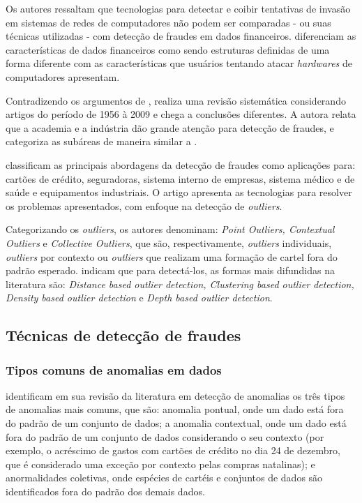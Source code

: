 \documentclass[smallextended]{svjour3}
\begin{document}
Os autores ressaltam que tecnologias para detectar e coibir tentativas de invasão em sistemas de redes de computadores não podem ser comparadas - ou suas técnicas utilizadas - com detecção de fraudes em dados financeiros. \cite{Flegel2010} diferenciam as características de dados financeiros como sendo estruturas definidas de uma forma diferente com as características que usuários tentando atacar \emph{hardwares} de computadores apresentam.

Contradizendo os argumentos de \cite{Flegel2010}, \cite{Pejic-Bach2010} realiza uma revisão sistemática considerando artigos do período de 1956 à 2009 e chega a conclusões diferentes. A autora relata que a academia e a indústria dão grande atenção para detecção de fraudes, e categoriza as subáreas de maneira similar a \cite{Abdallah2016}.

\cite{Bansal2016} classificam as principais abordagens da detecção de fraudes como aplicações para: cartões de crédito, seguradoras, sistema interno de empresas, sistema médico e de saúde e equipamentos industriais. O artigo apresenta as tecnologias para resolver os problemas apresentados, com enfoque na detecção de \emph{outliers}. 

Categorizando os \emph{outliers}, os autores denominam: \emph{Point Outliers, Contextual Outliers} e \emph{Collective Outliers}, que são, respectivamente, \emph{outliers} individuais, \emph{outliers} por contexto ou \emph{outliers} que realizam uma formação de cartel fora do padrão esperado. \cite{Bansal2016} indicam que para detectá-los, as formas mais difundidas na literatura são: \emph{Distance based outlier detection, Clustering based outlier detection, Density based outlier detection} e \emph{Depth based outlier detection}.

\subsection{Técnicas de detecção de fraudes}
	
\subsubsection{Tipos comuns de anomalias em dados}

\cite{Ahmed2015} identificam em sua revisão da literatura em detecção de anomalias os três tipos de anomalias mais comuns, que são: anomalia pontual, onde um dado está fora do padrão de um conjunto de dados; a anomalia contextual, onde um dado está fora do padrão de um conjunto de dados considerando o seu contexto (por exemplo, o acréscimo de gastos com cartões de crédito no dia 24 de dezembro, que é considerado uma exceção por contexto pelas compras natalinas); e anormalidades coletivas, onde espécies de cartéis e conjuntos de dados são identificados fora do padrão dos demais dados.
\end{document}
